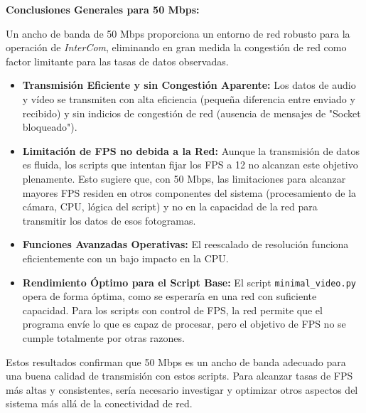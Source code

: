\textbf{Conclusiones Generales para 50 Mbps:}

Un ancho de banda de 50 Mbps proporciona un entorno de red robusto para la operación de \textit{InterCom}, eliminando en gran medida la congestión de red como factor limitante para las tasas de datos observadas.
\begin{itemize}
    \item \textbf{Transmisión Eficiente y sin Congestión Aparente:} Los datos de audio y vídeo se transmiten con alta eficiencia (pequeña diferencia entre enviado y recibido) y sin indicios de congestión de red (ausencia de mensajes de "Socket bloqueado").
    \item \textbf{Limitación de FPS no debida a la Red:} Aunque la transmisión de datos es fluida, los scripts que intentan fijar los FPS a 12 no alcanzan este objetivo plenamente. Esto sugiere que, con 50 Mbps, las limitaciones para alcanzar mayores FPS residen en otros componentes del sistema (procesamiento de la cámara, CPU, lógica del script) y no en la capacidad de la red para transmitir los datos de esos fotogramas.
    \item \textbf{Funciones Avanzadas Operativas:} El reescalado de resolución funciona eficientemente con un bajo impacto en la CPU.
    \item \textbf{Rendimiento Óptimo para el Script Base:} El script \texttt{minimal\_video.py} opera de forma óptima, como se esperaría en una red con suficiente capacidad. Para los scripts con control de FPS, la red permite que el programa envíe lo que es capaz de procesar, pero el objetivo de FPS no se cumple totalmente por otras razones.
\end{itemize}
Estos resultados confirman que 50 Mbps es un ancho de banda adecuado para una buena calidad de transmisión con estos scripts. Para alcanzar tasas de FPS más altas y consistentes, sería necesario investigar y optimizar otros aspectos del sistema más allá de la conectividad de red.

